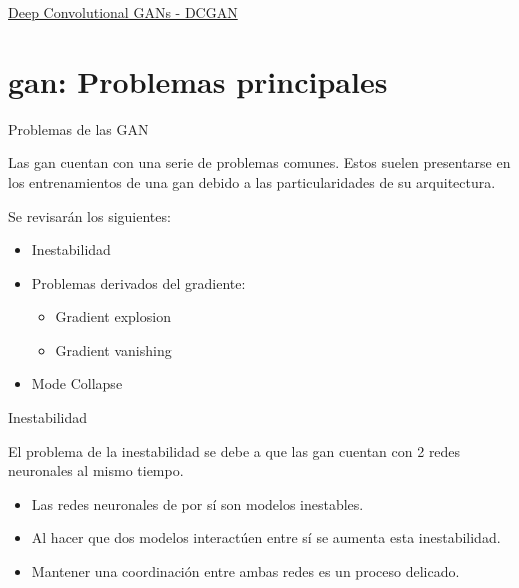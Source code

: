 \begin{exercise}
\href{https://colab.research.google.com/drive/1FxURNzD_FenraqJF9lHa81Dx4jNUjop-}{Deep Convolutional GANs - DCGAN}
\end{exercise}

\section{\gls{gan}: Problemas principales}

\begin{frame}{Problemas de las GAN}

    Las \gls{gan} cuentan con una serie de \alert{problemas comunes}. Estos suelen presentarse en los entrenamientos de una \gls{gan} debido a las particularidades de su \alert{arquitectura}.
    
    Se revisarán los siguientes:
    \begin{itemize}
        \item Inestabilidad
        \item Problemas derivados del gradiente:
        \begin{itemize}
            \item Gradient explosion
            \item Gradient vanishing
        \end{itemize}
        \item Mode Collapse
    \end{itemize}
    
\end{frame}

\begin{frame}{Inestabilidad}

    {\Large El problema de la \alert{inestabilidad} se debe a que las \gls{gan} cuentan con \alert{2} redes neuronales al mismo tiempo.}
    
    \begin{itemize}
        \item Las redes neuronales de por sí son modelos \alert{inestables}.
        \item Al hacer que dos modelos \alert{interactúen} entre sí se \alert{aumenta esta inestabilidad}.
        \item Mantener una \alert{coordinación} entre ambas redes es un \alert{proceso delicado}.
    \end{itemize}
    
\end{frame}

